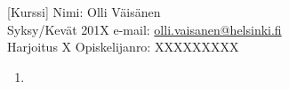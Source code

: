 \documentclass[a4paper, twoside, 12pt]{artikel3} %
\makeatletter
\newcommand{\email}{\href{mailto:olli.vaisanen@helsinki.fi}{olli.vaisanen@helsinki.fi}} %
\makeatother
\begin{document}
\ddmmyyyydate %
\pagestyle{empty} 
[Kurssi] \hfill Nimi: Olli Väisänen\\%
Syksy/Kevät 201X \hfill e-mail: \email \\
Harjoitus X \hfill Opiskelijanro: XXXXXXXXX \\%

\begin{enumerate}[Teht 1.] \itemsep12pt
	\item %
\end{enumerate}
\end{document}
